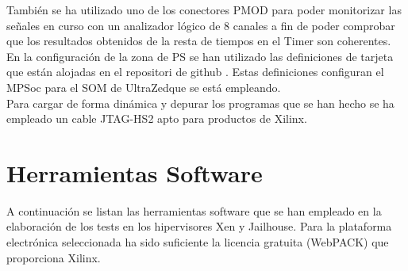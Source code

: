También se ha utilizado uno de los conectores \acrshort{PMOD} para poder monitorizar las señales en curso con un analizador lógico de 8 canales \cite{saleae} a fin de poder comprobar que los resultados obtenidos de la resta de tiempos en el Timer son coherentes.\\

En la configuración de la zona de \acrshort{PS} se han utilizado las definiciones de tarjeta que están alojadas en el repositori de github \cite{avnet_github}. Estas definiciones configuran el MPSoc para el \acrshort{SOM} de UltraZed\texttrademark que se está empleando.\\

Para cargar de forma dinámica y depurar los programas que se han hecho se ha empleado un cable JTAG-HS2 \cite{jtag_hs2} apto para productos de Xilinx.\\

\section{Herramientas Software}

A continuación se listan las herramientas software que se han empleado en la elaboración de los tests en los hipervisores Xen y Jailhouse. Para la plataforma electrónica seleccionada ha sido suficiente la licencia gratuita (WebPACK) que proporciona Xilinx.

